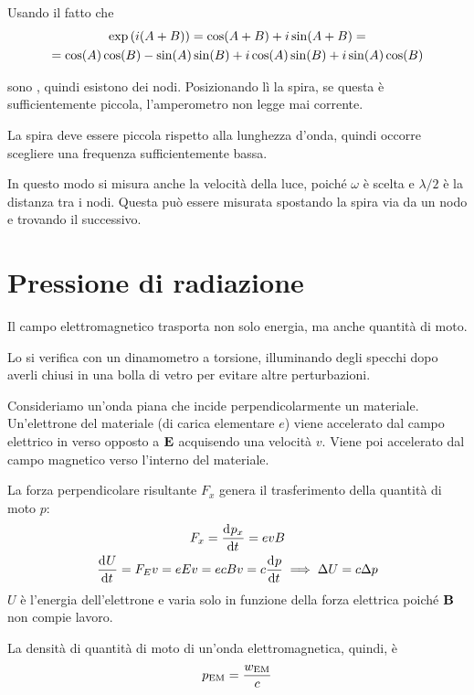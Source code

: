 Usando il fatto che
\begin{equation}
\begin{gathered}
    \operatorname{exp}\left( i (A + B) \right) = \cos(A + B) + i \sin(A + B)
    = \\
    = \cos(A) \cos(B) - \sin(A) \sin(B) + i \cos(A) \sin(B) + i \sin(A) \cos(B)
\end{gathered}
\end{equation}

 sono , quindi esistono dei nodi.
Posizionando lì la spira, se questa è sufficientemente piccola, l'amperometro non legge mai corrente.

La spira deve essere piccola rispetto alla lunghezza d'onda, quindi occorre scegliere una frequenza sufficientemente bassa.

In questo modo si misura anche la velocità della luce, poiché $\omega$ è scelta e $\lambda/2$ è la distanza tra i nodi.
Questa può essere misurata spostando la spira via da un nodo e trovando il successivo.



\section{Pressione di radiazione}

Il campo elettromagnetico trasporta non solo energia, ma anche quantità di moto.

Lo si verifica con un dinamometro a torsione, illuminando degli specchi dopo averli chiusi in una bolla di vetro per evitare altre perturbazioni.

Consideriamo un'onda piana che incide perpendicolarmente un materiale.
Un'elettrone del materiale (di carica elementare $e$) viene accelerato dal campo elettrico in verso opposto a $\mathbf{E}$ acquisendo una velocità $v$.
Viene poi accelerato dal campo magnetico verso l'interno del materiale.

La forza perpendicolare risultante $F_x$ genera il trasferimento della quantità di moto $p$:
\begin{gather}
    F_x = \der[p_x]{t} = e v B \\
    \der[U]{t} = F_E v = e E v = e c B v = c \der[p]{t}
    \implies \Delta U = c \Delta p
\end{gather}
$U$ è l'energia dell'elettrone e varia solo in funzione della forza elettrica poiché $\mathbf{B}$ non compie lavoro.

La densità di quantità di moto di un'onda elettromagnetica, quindi, è
\begin{equation}
    p_\mathrm{EM} = \frac{w_\mathrm{EM}}{c}
\end{equation}


